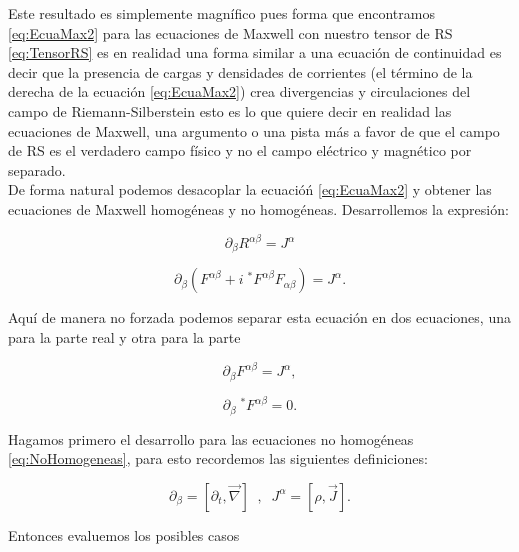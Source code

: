         Este resultado es simplemente magnífico pues forma que encontramos \ref{eq:EcuaMax2} para las ecuaciones de Maxwell con nuestro tensor de RS \ref{eq:TensorRS} es en realidad una forma similar a una ecuación de continuidad es decir que la presencia de cargas y densidades de corrientes (el término de la derecha de la ecuación \ref{eq:EcuaMax2}) crea divergencias y circulaciones del campo de Riemann-Silberstein esto es lo que quiere decir en realidad las ecuaciones de Maxwell, una argumento o una pista más a favor de que el campo de RS es el verdadero campo físico y no el campo eléctrico y magnético por separado.\\

        De forma natural podemos desacoplar la ecuacióń \ref{eq:EcuaMax2} y obtener las ecuaciones de Maxwell homogéneas y no homogéneas. Desarrollemos la expresión:

        \begin{equation*}
            \partial_{\beta}R^{\alpha\beta}=J^{\alpha}
        \end{equation*}

        \begin{equation}
            \partial_{\beta}(F^{\alpha\beta} + i\;^*F^{\alpha\beta}F_{\alpha\beta}) = J^{\alpha}.
        \end{equation}

        Aquí de manera no forzada podemos separar esta ecuación en dos ecuaciones, una para la parte real y otra para la parte 

        \begin{equation}\label{eq:NoHomogeneas}
            \partial_{\beta}F^{\alpha\beta} = J^{\alpha},
        \end{equation}

        \begin{equation}\label{eq:Homogeneas}
            \partial_{\beta}\;^*F^{\alpha\beta} = 0.
        \end{equation}


        Hagamos primero el desarrollo para las ecuaciones no homogéneas \ref{eq:NoHomogeneas}, para esto recordemos las siguientes definiciones:

        \begin{equation}
            \partial_{\beta} = [\partial_t , \Vec{\nabla}] \;\;,\;\; J^{\alpha} = [\rho , \Vec{J}].
        \end{equation}

        Entonces evaluemos los posibles casos

